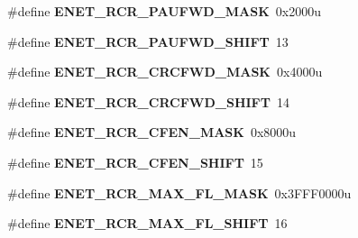 \begin{DoxyCompactItemize}
\item 
\#define {\bfseries E\+N\+E\+T\+\_\+\+R\+C\+R\+\_\+\+P\+A\+U\+F\+W\+D\+\_\+\+M\+A\+SK}~0x2000u\hypertarget{group__ENET__Register__Masks_ga664fa2802383748f83527ad422cede34}{}\label{group__ENET__Register__Masks_ga664fa2802383748f83527ad422cede34}

\item 
\#define {\bfseries E\+N\+E\+T\+\_\+\+R\+C\+R\+\_\+\+P\+A\+U\+F\+W\+D\+\_\+\+S\+H\+I\+FT}~13\hypertarget{group__ENET__Register__Masks_gace2ee9a69ab345416d6f15835b49f689}{}\label{group__ENET__Register__Masks_gace2ee9a69ab345416d6f15835b49f689}

\item 
\#define {\bfseries E\+N\+E\+T\+\_\+\+R\+C\+R\+\_\+\+C\+R\+C\+F\+W\+D\+\_\+\+M\+A\+SK}~0x4000u\hypertarget{group__ENET__Register__Masks_gab00e088ecf7a8439af6dfc86951e65a9}{}\label{group__ENET__Register__Masks_gab00e088ecf7a8439af6dfc86951e65a9}

\item 
\#define {\bfseries E\+N\+E\+T\+\_\+\+R\+C\+R\+\_\+\+C\+R\+C\+F\+W\+D\+\_\+\+S\+H\+I\+FT}~14\hypertarget{group__ENET__Register__Masks_gacc33ea25694cc26264d3bec46a69fa2d}{}\label{group__ENET__Register__Masks_gacc33ea25694cc26264d3bec46a69fa2d}

\item 
\#define {\bfseries E\+N\+E\+T\+\_\+\+R\+C\+R\+\_\+\+C\+F\+E\+N\+\_\+\+M\+A\+SK}~0x8000u\hypertarget{group__ENET__Register__Masks_ga37304dd0d74e9be8367adad2e57ce358}{}\label{group__ENET__Register__Masks_ga37304dd0d74e9be8367adad2e57ce358}

\item 
\#define {\bfseries E\+N\+E\+T\+\_\+\+R\+C\+R\+\_\+\+C\+F\+E\+N\+\_\+\+S\+H\+I\+FT}~15\hypertarget{group__ENET__Register__Masks_ga01c9e6e46880a41e6219729598048b1e}{}\label{group__ENET__Register__Masks_ga01c9e6e46880a41e6219729598048b1e}

\item 
\#define {\bfseries E\+N\+E\+T\+\_\+\+R\+C\+R\+\_\+\+M\+A\+X\+\_\+\+F\+L\+\_\+\+M\+A\+SK}~0x3\+F\+F\+F0000u\hypertarget{group__ENET__Register__Masks_ga1e61cf8300255cf3f9873a6bd9e1ffe6}{}\label{group__ENET__Register__Masks_ga1e61cf8300255cf3f9873a6bd9e1ffe6}

\item 
\#define {\bfseries E\+N\+E\+T\+\_\+\+R\+C\+R\+\_\+\+M\+A\+X\+\_\+\+F\+L\+\_\+\+S\+H\+I\+FT}~16\hypertarget{group__ENET__Register__Masks_ga835b5d285dad4b324f26c4edcc4e00d1}{}\label{group__ENET__Register__Masks_ga835b5d285dad4b324f26c4edcc4e00d1}


\end{DoxyCompactItemize}
